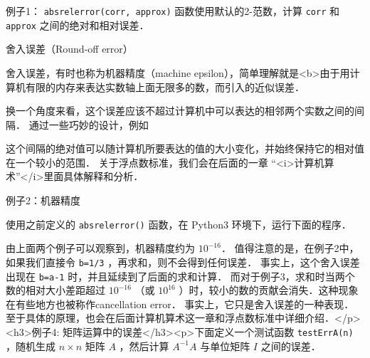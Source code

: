 例子1：  \verb|absrelerror(corr, approx)| 函数使用默认的2-范数，计算 \verb|corr| 和 \verb|approx| 之间的绝对和相对误差．




舍入误差（Round-off error）

舍入误差，有时也称为机器精度（machine epsilon），简单理解就是<b>由于用计算机有限的内存来表达实数轴上面无限多的数，而引入的近似误差．

换一个角度来看，这个误差应该不超过计算机中可以表达的相邻两个实数之间的间隔． 通过一些巧妙的设计，例如

这个间隔的绝对值可以随计算机所要表达的值的大小变化，并始终保持它的相对值在一个较小的范围． 关于浮点数标准，我们会在后面的一章 “<i>计算机算术”</i>里面具体解释和分析．

例子2：机器精度

使用之前定义的 \verb|absrelerror()| 函数，在 Python3 环境下，运行下面的程序．

由上面两个例子可以观察到，机器精度约为  $10^{-16}$． 值得注意的是，在例子2中， 如果我们直接令 \verb|b=1/3| ，再求和，则不会得到任何误差． 事实上，这个舍入误差出现在 \verb|b=a-1| 时，并且延续到了后面的求和计算． 而对于例子3，求和时当两个数的相对大小差距超过  $10^{-16}$  （或  $10^{16}$  ）时，较小的数的贡献会消失．这种现象在有些地方也被称作cancellation error． 事实上，它只是舍入误差的一种表现． 至于具体的原理，也会在后面计算机算术这一章和浮点数标准中详细介绍．</p><h3>例子4: 矩阵运算中的误差</h3><p>下面定义一个测试函数 \verb|testErrA(n)| ，随机生成  $n\times n$  矩阵  $A$  ，然后计算  $A^{-1}A$  与单位矩阵  $I$  之间的误差．

